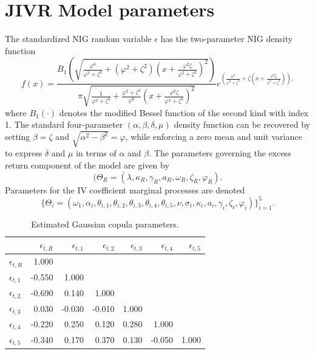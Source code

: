 \documentclass[12pt]{article}
\begin{document}
\section{JIVR Model parameters}

The standardized NIG random variable \(\epsilon\) has the two-parameter NIG density function 
$$f(x)=\frac{B_{1}\left( \sqrt{\frac{\varphi^{6}}{\varphi^{2}+\zeta^{2}}+(\varphi^{2}+\zeta^{2})\left(x+ \frac{\varphi^{2}\zeta}{\varphi^{2}+\zeta^{2}} \right)^{2}} \right)}{\pi\sqrt{\frac{1}{\varphi^{2}+\zeta^{2}}+\frac{\varphi^{2}+\zeta^{2}}{\varphi^{6}}\left(x+ \frac{\varphi^{2}\zeta}{\varphi^{2}+\zeta^{2}} \right)^{2}} } e^{\left( \frac{\varphi^{4}}{\varphi^{2}+\zeta^{2}}+\zeta\left(x+ \frac{\varphi^{2}\zeta}{\varphi^{2}+\zeta^{2}} \right) \right),}$$ where $B_{1}(\cdot)$ denotes the modified Bessel function of the second kind with index 1. 
The standard four-parameter $(\alpha, \beta, \delta, \mu)$ density function can be recovered by setting $\beta = \zeta$ and $\sqrt{\alpha^2 - \beta^2} = \varphi$, while enforcing a zero mean and unit variance to express $\delta$ and $\mu$ in terms of $\alpha$ and $\beta$. The parameters governing the excess return component of the model are given by 
$$(\Theta_R = (\lambda, \kappa_R, \gamma_R, a_R, \omega_R, \zeta_R, \varphi_R).$$ 
Parameters for the IV coefficient marginal processes are denoted
$$\{ \Theta_i = (\omega_1, \alpha_i, \theta_{i,1}, \theta_{i,2}, \theta_{i,3}, \theta_{i,4}, \theta_{i,5}, \nu, \sigma_i, \kappa_i, a_i, \gamma_i, \zeta_i, \varphi_i)\}_{i=1}^{5}.$$

\begin{table}[H]
\centering
\renewcommand{\arraystretch}{1.5}
\caption{Estimated Gaussian copula parameters.}
\begin{tabular}{lrrrrrr}
\toprule
 & $\epsilon_{t,R}$ & $\epsilon_{t,1}$ & $\epsilon_{t,2}$ & $\epsilon_{t,3}$ & $\epsilon_{t,4}$ & $\epsilon_{t,5}$ \\
\midrule
$\epsilon_{t,R}$ & 1.000 &  &  &  & &  \\
$\epsilon_{t,1}$ & -0.550 & 1.000 &  &  &  &  \\
$\epsilon_{t,2}$ & -0.690 & 0.140 & 1.000 &  & &  \\
$\epsilon_{t,3}$ & 0.030 & -0.030 & -0.010 & 1.000 &  &  \\
$\epsilon_{t,4}$ & -0.220 & 0.250 & 0.120 & 0.280 & 1.000 &  \\
$\epsilon_{t,5}$ & -0.340 & 0.170 & 0.370 & 0.130 & -0.050 & 1.000 \\
\bottomrule
\end{tabular}
\end{table}
\end{document}
